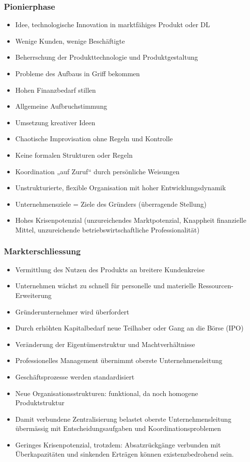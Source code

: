 \subsubsection{Pionierphase}
\begin{itemize}
	\item Idee, technologische Innovation in marktfähiges Produkt oder DL
	\item Wenige Kunden, wenige Beschäftigte
	\item Beherrschung der Produkttechnologie und Produktgestaltung
	\item Probleme des Aufbaus in Griff bekommen
	\item Hohen Finanzbedarf stillen
	\item Allgemeine Aufbruchstimmung
	\item Umsetzung kreativer Ideen
	\item Chaotische Improvisation ohne Regeln und Kontrolle
	\item Keine formalen Strukturen oder Regeln
	\item Koordination „auf Zuruf“ durch persönliche Weisungen
	\item Unstrukturierte, flexible Organisation mit hoher Entwicklungsdynamik
	\item Unternehmensziele = Ziele des Gründers (überragende Stellung)
	\item Hohes Krisenpotenzial (unzureichendes Marktpotenzial, Knappheit finanzielle Mittel, unzureichende betriebswirtschaftliche Professionalität)
\end{itemize}

\subsubsection{Markterschliessung}
\begin{itemize}
	\item Vermittlung des Nutzen des Produkts an breitere Kundenkreise
	\item Unternehmen wächst zu schnell für personelle und materielle Ressourcen-Erweiterung
	\item Gründerunternehmer wird überfordert
	\item Durch erhöhten Kapitalbedarf neue Teilhaber oder Gang an die Börse (IPO)
	\item Veränderung der Eigentümerstruktur und Machtverhältnisse
	\item Professionelles Management übernimmt oberste Unternehmensleitung
	\item Geschäftsprozesse werden standardisiert
	\item Neue Organisationsstrukturen: funktional, da noch homogene Produktstruktur
	\item Damit verbundene Zentralisierung belastet oberste Unternehmensleitung	übermässig mit Entscheidungsaufgaben und Koordinationsproblemen
	\item Geringes Krisenpotenzial, trotzdem: Absatzrückgänge verbunden mit Überkapazitäten und sinkenden Erträgen können existenzbedrohend sein.
\end{itemize}

